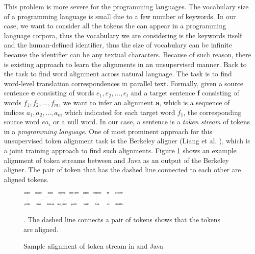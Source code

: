 This problem is more severe for the programming languages. The vocabulary size of a programming language is small due to a few number of keywords. In our case, we want to consider all the tokens the can appear in a programming language corpora, thus the vocabulary we are considering is the keywords itself and the human-defined identifier, thus the size of vocabulary can be infinite because the identifier can be any textual characters. Because of such reason, there is existing approach to learn the alignments in an unsupervised manner. Back to the task to find word alignment across natural language. The task is to find word-level translation correspondences in parallel text. Formally, given a source sentence \textbf{e} consisting of words \begin{math} e_{1}, e_{2}, ...,e_{l}\end{math} and a target sentence \textbf{f} consisting of words \begin{math} f_{1}, f_{2}, ...,f_{m}\end{math}, we want to infer an alignment \textbf{a}, which is a sequence of indices \begin{math} a_{1}, a_{2}, ...,a_{m}\end{math} which indicated for each target word \begin{math} f_{1}\end{math}, the corresponding source word \begin{math}e{a_{i}}\end{math} or a null word. In our case, a sentence is a \textit{token stream} of tokens in a \textit{programming language}. One of most prominent approach for this unsupervised token alignment task is the Berkeley aligner (Liang et al. \cite{liang2006alignment}), which is a joint training approach to find such alignments. Figure \ref{fig:unsupervised_token_alignment} shows an example alignment of token streams between  and Java as an output of the Berkeley aligner. The pair of token that has the dashed line connected to each other are aligned tokens.

\begin{figure}[t!]
	
	\includegraphics[width=0.48\textwidth]{alignment}
	\caption{Sample alignment of token stream in  and Java}. The dashed line connects a pair of tokens shows that the tokens are aligned. 
	\label{fig:unsupervised_token_alignment}
\end{figure}
